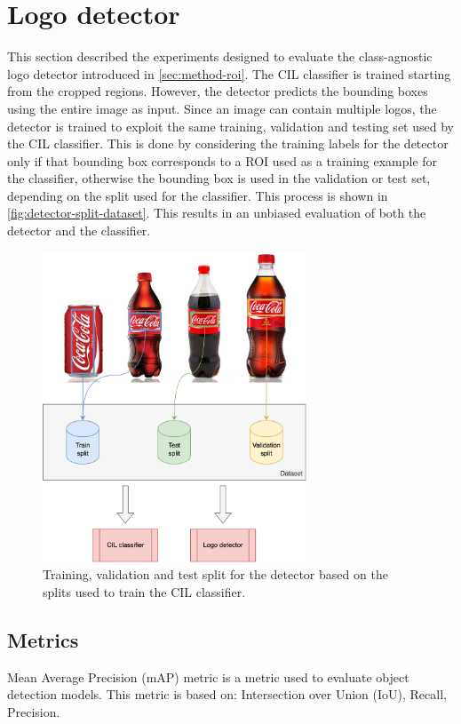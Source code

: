 \newpage

\section{Logo detector}
\label{sec:exp-det}
This section described the experiments designed to evaluate the class-agnostic logo detector introduced in \autoref{sec:method-roi}.
The CIL classifier is trained starting from the cropped regions.
However, the detector predicts the bounding boxes using the entire image as input.
Since an image can contain multiple logos, the detector is trained to exploit the same training, validation and testing set used by the CIL classifier.
This is done by considering the training labels for the detector only if that bounding box corresponds to a ROI used as a training example for the classifier, otherwise the bounding box is used in the validation or test set, depending on the split used for the classifier.
This process is shown in \autoref{fig:detector-split-dataset}.
This results in an unbiased evaluation of both the detector and the classifier.

\begin{figure}[H]
	\centering
    \includegraphics[width=0.7\textwidth]{images/logos-split.drawio.png}
	\caption{Training, validation and test split for the detector based on the splits used to train the CIL classifier.}%
	\label{fig:detector-split-dataset}%
\end{figure}

\subsection{Metrics}
Mean Average Precision (mAP) metric is a metric used to evaluate object detection models. This metric is based on: Intersection over Union (IoU), Recall, Precision.

